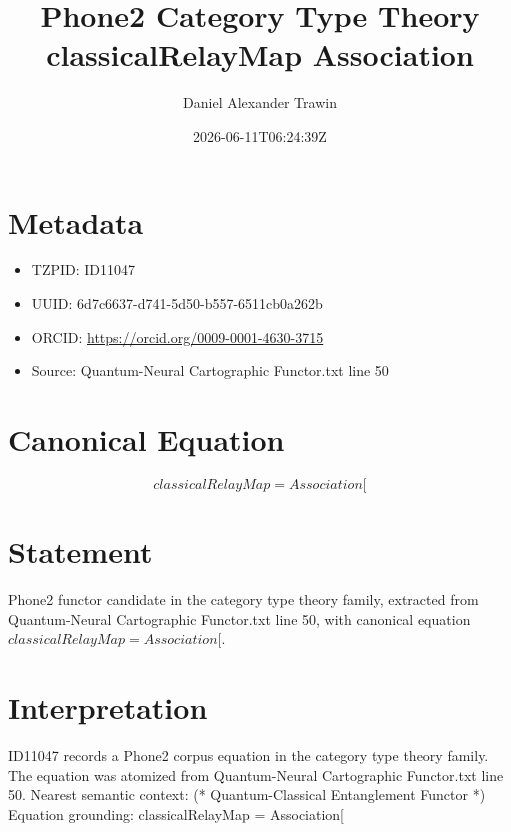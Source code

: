 \documentclass[11pt]{article}
\title{Phone2 Category Type Theory classicalRelayMap Association}
\author{Daniel Alexander Trawin}
\date{2026-06-11T06:24:39Z}
\begin{document}
\maketitle
\section*{Metadata}
\begin{itemize}
\item TZPID: ID11047
\item UUID: 6d7c6637-d741-5d50-b557-6511cb0a262b
\item ORCID: \url{https://orcid.org/0009-0001-4630-3715}
\item Source: Quantum-Neural Cartographic Functor.txt line 50
\end{itemize}
\section*{Canonical Equation}
\[
classicalRelayMap = Association[
\]
\section*{Statement}
Phone2 functor candidate in the category type theory family, extracted from Quantum-Neural Cartographic Functor.txt line 50, with canonical equation $classicalRelayMap = Association[$.
\section*{Interpretation}
ID11047 records a Phone2 corpus equation in the category type theory family. The equation was atomized from Quantum-Neural Cartographic Functor.txt line 50. Nearest semantic context: (* Quantum-Classical Entanglement Functor *) Equation grounding: classicalRelayMap = Association[
\end{document}
